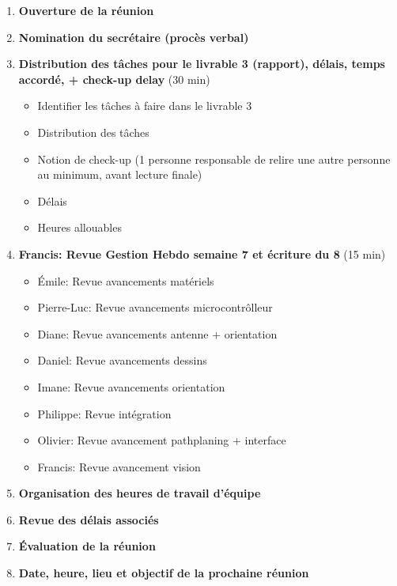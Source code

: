 \documentclass[12pt]{ULojpv}
\begin{document}
\entete
\begin{enumerate}
   \item \textbf{Ouverture de la réunion}
   \item \textbf{Nomination du secrétaire (procès verbal)}
   \item \textbf{Distribution des tâches pour le livrable 3 (rapport), délais, temps accordé, + check-up delay} (30 min)
   \begin{itemize}
   \item Identifier les tâches à faire dans le livrable 3
   \item Distribution des tâches
   \item Notion de check-up (1 personne responsable de relire une autre personne au minimum, avant lecture finale)
   \item Délais
   \item Heures allouables
   \end{itemize}
   \item \textbf{Francis: Revue Gestion Hebdo semaine 7 et écriture du 8} (15 min)
   \begin{itemize}
   \item Émile: Revue avancements matériels
   \item Pierre-Luc: Revue avancements microcontrôlleur 
   \item Diane: Revue avancements antenne + orientation
   \item Daniel: Revue avancements dessins
   \item Imane: Revue avancements orientation
   \item Philippe: Revue intégration
   \item Olivier: Revue avancement pathplaning + interface
   \item Francis: Revue avancement vision
   \end{itemize}
   \item \textbf{Organisation des heures de travail d'équipe}
   \item \textbf{Revue des délais associés}
   \item \textbf{Évaluation de la réunion}
   \item \textbf{Date, heure, lieu et objectif de la prochaine réunion}
\end{enumerate}
\end{document}
